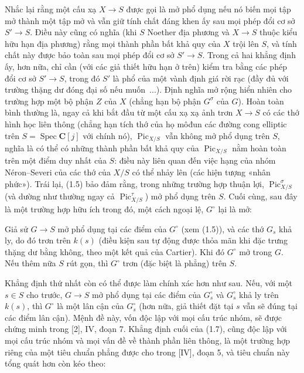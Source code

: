  Nhắc lại rằng một cấu xạ $X\longrightarrow S$ được gọi
là mở phổ dụng nếu nó biến mọi tập mở thành một tập mở và vẫn giữ tính chất
đáng khen ấy sau mọi phép đổi cơ sở $S'\longrightarrow S$. Điều này cũng có
nghĩa (khi $S$ Noether địa phương và $X\longrightarrow S$ thuộc kiểu hữu hạn
địa phương) rằng mọi thành phần bất khả quy của $X$ trội lên $S$, và tính chất
này được bảo toàn sau mọi phép đổi cơ sở $S'\longrightarrow S$. Trong cả hai
khẳng định ấy, hơn nữa, chỉ cần (với các giả thiết hữu hạn ở trên) kiểm tra
bằng các phép đổi cơ sở $S'\longrightarrow S$, trong đó $S'$ là phổ của một
vành định giá rời rạc (đầy đủ với trường thặng dư đóng đại số nếu muốn~...).
Định nghĩa mở rộng hiển nhiên cho trường hợp một bộ phận $Z$ của $X$ (chẳng
hạn bộ phận $G^\sigma$ của $G$). Hoàn toàn bình thường là, ngay cả khi bắt đầu
từ một cấu xạ xạ ảnh trơn $X\longrightarrow S$ có các thớ hình học liên thông
(chẳng hạn tích thớ của họ môđun các đường cong elliptic trên
$S=\operatorname{Spec}\mathbf C[j]$ với chính nó),
$\operatorname{Pic}_{X/S}$ vẫn không mở phổ dụng trên $S$, nghĩa là có thể có
những thành phần bất khả quy của $\operatorname{Pic}_{X/S}$ nằm hoàn toàn
trên một điểm duy nhất của $S$: điều này liên quan đến việc hạng của nhóm
Néron--Severi của các thớ của $X/S$ có thể nhảy lên (các hiện tượng «nhân
phức»). Trái lại, (1.5) bảo đảm rằng, trong những trường hợp thuận lợi,
$\operatorname{Pic}_{X/S}^\sigma$ (và dường như thường ngay cả
$\operatorname{Pic}_{X/S}^\tau$) mở phổ dụng trên $S$.
Cuối cùng, sau đây là một trường hợp hữu ích trong đó, một cách ngoại lệ,
$G^\circ$ lại là mở:

 Giả sử $G\longrightarrow S$ mở phổ dụng tại các điểm của
$G^\circ$ (xem (1.5)), và các thớ $G_s$ khả ly, do đó trơn trên $k(s)$ (điều
kiện sau tự động được thỏa mãn khi đặc trưng thặng dư bằng không, theo một kết
quả của Cartier). Khi đó $G^\circ$ mở trong $G$. Nếu thêm nữa $S$ rút gọn, thì
$G^\circ$ trơn (đặc biệt là phẳng) trên $S$.

Khẳng định thứ nhất còn có thể được làm chính xác hơn như sau. Nếu, với một
$s\in S$ cho trước, $G\longrightarrow S$ mở phổ dụng tại các điểm của
$G_s^\circ$ và $G_s^\circ$ khả ly trên $k(s)$, thì $G^\circ$ là một lân cận
của $G_s^\circ$ (hơn nữa, giả thiết đặt tại $s$ vẫn sẽ đúng tại các điểm lân
cận). Mệnh đề này, vốn độc lập với mọi cấu trúc nhóm, sẽ được chứng minh trong
[2], IV, đoạn 7. Khẳng định cuối của (1.7), cũng độc lập với mọi cấu trúc nhóm
và mọi vấn đề về thành phần liên thông, là một trường hợp riêng của một tiêu
chuẩn phẳng được cho trong [IV], đoạn 5, và tiêu chuẩn này tổng quát hơn còn
kéo theo:

